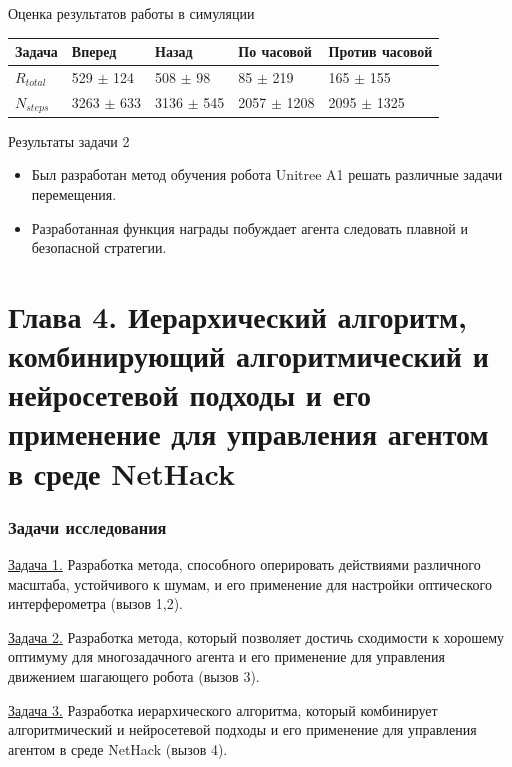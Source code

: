 \begin{frame}{Оценка результатов работы в симуляции}
\begin{table} [htbp]
\begin{threeparttable}
\begin{tabular}{| p{1cm} || p{2cm} | p{2cm} | p{2cm} |p{2cm} |}
            \hline
            \hline
            Задача & Вперед & Назад & По часовой & Против часовой \\
            \hline
            $R_{total}$ &	529 $\pm$ 124 &	508 $\pm$ 98 &	85 $\pm$ 219 &	165 $\pm$ 155 \\
            $N_{steps}$ & 3263 $\pm$ 633 &	3136 $\pm$ 545 &	2057 $\pm$ 1208 &	2095 $\pm$ 1325 \\
            \hline
            \hline
        \end{tabular}
    \end{threeparttable}
\end{table}
\end{frame}

\begin{frame}{Результаты задачи 2}
\begin{itemize}
    \item[\textcolor{ForestGreen}{\checkmark}] Был разработан метод обучения робота Unitree A1 решать различные задачи перемещения.
    \item[\textcolor{ForestGreen}{\checkmark}] Разработанная функция награды побуждает агента следовать плавной и безопасной стратегии.
\end{itemize}
\end{frame}



\section{Глава 4. Иерархический алгоритм, комбинирующий алгоритмический и
нейросетевой подходы и его применение для управления агентом в среде NetHack}

\begin{frame}
    \frametitle{Задачи исследования}
    \begin{itemize} 
        \item \underline{Задача 1.} Разработка метода, способного оперировать действиями различного масштаба, устойчивого к шумам, и его применение для настройки оптического интерферометра (вызов 1,2).
        \item \underline{Задача 2.} Разработка метода, который позволяет достичь сходимости к хорошему оптимуму для многозадачного агента и его применение  для управления движением шагающего робота (вызов 3).
        {\color{orange}\item \underline{Задача 3.} Разработка иерархического алгоритма, который комбинирует алгоритмический и нейросетевой подходы и его применение для управления агентом в среде NetHack (вызов 4).}
    \end{itemize}
\end{frame}

